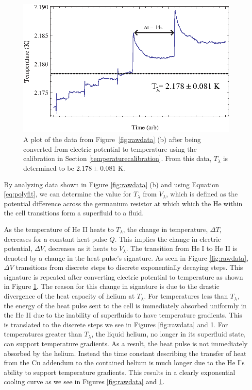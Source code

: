 \begin{figure}[htbp]
\begin{center}
\includegraphics[height=70mm]{./figures/heatingdata.eps}
\caption{\small{A plot of the data from Figure~\ref{fig:rawdata} (b) after being converted from electric potential to temperature using the calibration in Section \ref{temperaturecalibration}.  From this data, $T_{\lambda}$ is determined to be $2.178\pm0.081$ K.}}
\label{fig:heatingdata}
\end{center}
\end{figure}

By analyzing data shown in Figure \ref{fig:rawdata} (b) and using Equation \ref{eq:polyfit}, we can determine the value for $T_{\lambda}$ from $V_{\lambda}$, which is defined as the potential difference across the germanium resistor at which which the He within the cell transitions form a superfluid to a fluid. 

As the temperature of He II heats to $T_{\lambda}$, the change in temperature, $\Delta T$, decreases for a constant heat pulse $Q$.  This implies the change in electric potential, $\Delta V$, decreases as it heats to $V_{\lambda}$.  The transition from He I to He II is denoted by a change in the heat pulse's signature.  As seen in Figure \ref{fig:rawdata}, $\Delta V$ transitions from discrete steps to discrete exponentially decaying steps.  This signature is repeated after converting electric potential to temperature as shown in Figure \ref{fig:heatingdata}.  The reason for this change in signature is due to the drastic divergence of the heat capacity of helium at $T_{\lambda}$.  For temperatures less than $T_{\lambda}$, the energy of the heat pulse sent to the cell is immediately absorbed uniformly in the He II due to the inability of superfluids to have temperature gradients.  This is translated to the discrete steps we see in Figures \ref{fig:rawdata} and \ref{fig:heatingdata}.  For temperatures greater than $T_{\lambda}$, the liquid helium, no longer in its superfluid state, can support temperature gradients.  As a result, the heat pulse is not immediately absorbed by the helium.  Instead the time constant describing the transfer of heat from the Cu addendum to the contained helium is much longer due to the He I's ability to support temperature gradients. This results in a clearly exponential cooling curve as we see in Figures \ref{fig:rawdata} and \ref{fig:heatingdata}.  

